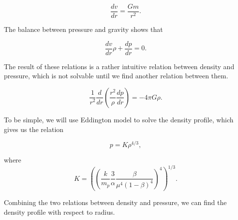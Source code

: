 \documentclass{tufte-handout}
\begin{document}
\begin{equation*}
    \frac{dv}{dr} = \frac{G m}{r^2}.
\end{equation*}

The balance between pressure and gravity shows that

\begin{equation*}
    \frac{dv}{dr} \rho + \frac{dp}{dr} = 0.
\end{equation*}

The result of these relations is a rather intuitive relation between density and pressure, which is not solvable until we find another relation between them.

\begin{equation*}
    \frac{1}{r^2} \frac{d}{dr} \left( \frac{r^2}{\rho} \frac{dp}{dr} \right) = -4\pi G\rho.
\end{equation*}

To be simple, we will use Eddington model to solve the density profile, which gives us the relation

\begin{equation*}
    p = K \rho^{4/3},
\end{equation*}


where 
\begin{equation*}
    K = \left(  \left( \frac{k}{m_p} \frac{3}{\alpha} \frac{\beta}{\mu^4(1-\beta)^4}  \right)^4  \right)^{1/3}.
\end{equation*}

Combining the two relations between density and pressure, we can find the density profile with respect to radius.








\end{document}
